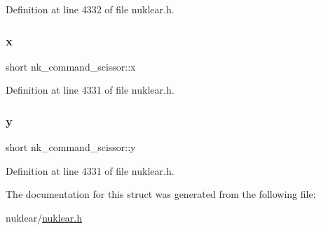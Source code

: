 Definition at line 4332 of file nuklear.\+h.

\mbox{\label{structnk__command__scissor_aefabf712b38b86e869d552a11c59c9d4}} 
\subsubsection{\texorpdfstring{x}{x}}
{\footnotesize\ttfamily short nk\+\_\+command\+\_\+scissor\+::x}



Definition at line 4331 of file nuklear.\+h.

\mbox{\label{structnk__command__scissor_a12150dd6ece25013658ea6adcfe5c530}} 
\subsubsection{\texorpdfstring{y}{y}}
{\footnotesize\ttfamily short nk\+\_\+command\+\_\+scissor\+::y}



Definition at line 4331 of file nuklear.\+h.



The documentation for this struct was generated from the following file\+:\begin{DoxyCompactItemize}
\item 
nuklear/\mbox{\hyperlink{nuklear_8h}{nuklear.\+h}}\end{DoxyCompactItemize}
